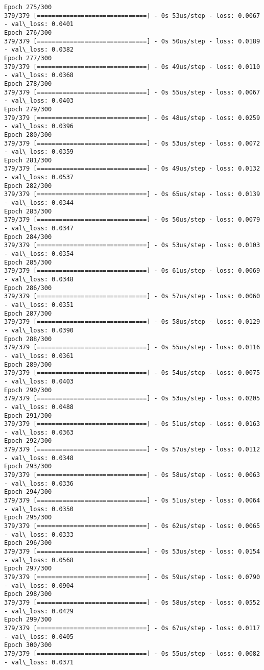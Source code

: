\documentclass[11pt]{article}
\begin{document}
\begin{Verbatim}[commandchars=\\\{\}]
Epoch 275/300
379/379 [==============================] - 0s 53us/step - loss: 0.0067 - val\_loss: 0.0401
Epoch 276/300
379/379 [==============================] - 0s 50us/step - loss: 0.0189 - val\_loss: 0.0382
Epoch 277/300
379/379 [==============================] - 0s 49us/step - loss: 0.0110 - val\_loss: 0.0368
Epoch 278/300
379/379 [==============================] - 0s 55us/step - loss: 0.0067 - val\_loss: 0.0403
Epoch 279/300
379/379 [==============================] - 0s 48us/step - loss: 0.0259 - val\_loss: 0.0396
Epoch 280/300
379/379 [==============================] - 0s 53us/step - loss: 0.0072 - val\_loss: 0.0359
Epoch 281/300
379/379 [==============================] - 0s 49us/step - loss: 0.0132 - val\_loss: 0.0537
Epoch 282/300
379/379 [==============================] - 0s 65us/step - loss: 0.0139 - val\_loss: 0.0344
Epoch 283/300
379/379 [==============================] - 0s 50us/step - loss: 0.0079 - val\_loss: 0.0347
Epoch 284/300
379/379 [==============================] - 0s 53us/step - loss: 0.0103 - val\_loss: 0.0354
Epoch 285/300
379/379 [==============================] - 0s 61us/step - loss: 0.0069 - val\_loss: 0.0348
Epoch 286/300
379/379 [==============================] - 0s 57us/step - loss: 0.0060 - val\_loss: 0.0351
Epoch 287/300
379/379 [==============================] - 0s 58us/step - loss: 0.0129 - val\_loss: 0.0390
Epoch 288/300
379/379 [==============================] - 0s 55us/step - loss: 0.0116 - val\_loss: 0.0361
Epoch 289/300
379/379 [==============================] - 0s 54us/step - loss: 0.0075 - val\_loss: 0.0403
Epoch 290/300
379/379 [==============================] - 0s 53us/step - loss: 0.0205 - val\_loss: 0.0488
Epoch 291/300
379/379 [==============================] - 0s 51us/step - loss: 0.0163 - val\_loss: 0.0363
Epoch 292/300
379/379 [==============================] - 0s 57us/step - loss: 0.0112 - val\_loss: 0.0348
Epoch 293/300
379/379 [==============================] - 0s 58us/step - loss: 0.0063 - val\_loss: 0.0336
Epoch 294/300
379/379 [==============================] - 0s 51us/step - loss: 0.0064 - val\_loss: 0.0350
Epoch 295/300
379/379 [==============================] - 0s 62us/step - loss: 0.0065 - val\_loss: 0.0333
Epoch 296/300
379/379 [==============================] - 0s 53us/step - loss: 0.0154 - val\_loss: 0.0568
Epoch 297/300
379/379 [==============================] - 0s 59us/step - loss: 0.0790 - val\_loss: 0.0904
Epoch 298/300
379/379 [==============================] - 0s 58us/step - loss: 0.0552 - val\_loss: 0.0429
Epoch 299/300
379/379 [==============================] - 0s 67us/step - loss: 0.0117 - val\_loss: 0.0405
Epoch 300/300
379/379 [==============================] - 0s 55us/step - loss: 0.0082 - val\_loss: 0.0371

    \end{Verbatim}
\end{document}
